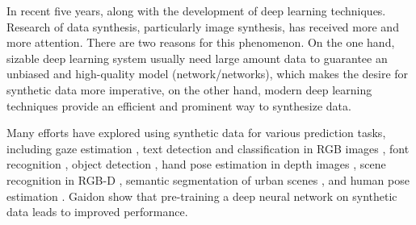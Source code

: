 \documentclass{iitthesis}
\begin{document}
In recent five years, along with the development of deep learning techniques. Research of data synthesis, particularly image synthesis, has received more and more attention. There are two reasons for this phenomenon. On the one hand, sizable deep learning system usually need large amount data to guarantee an unbiased and high-quality model (network/networks), which makes the desire for synthetic data more imperative, on the other hand, modern deep learning techniques provide an efficient and prominent way to synthesize data. 

Many efforts have explored using synthetic data for various prediction tasks, including gaze estimation \cite{wood2016learning}, text detection and classification in RGB images \cite{gupta2016synthetic}, font recognition \cite{wang2015deepfont}, object detection \cite{gupta2014learning}, hand pose estimation in depth images \cite{tompson2014real}\cite{supancic2015depth}, scene recognition in RGB-D , semantic segmentation of urban scenes \cite{ros2016synthia}, and human pose estimation 
\cite{park2015articulated}\cite{shakhnarovich2003fast}\cite{lecun2004learning}\cite{ionescu2014human3}\cite{pishchulin2012articulated}\cite{rogez2016mocap}.  Gaidon \cite{gaidon2016virtual} show that pre-training a deep neural network on synthetic data leads to improved performance.
\end{document}
